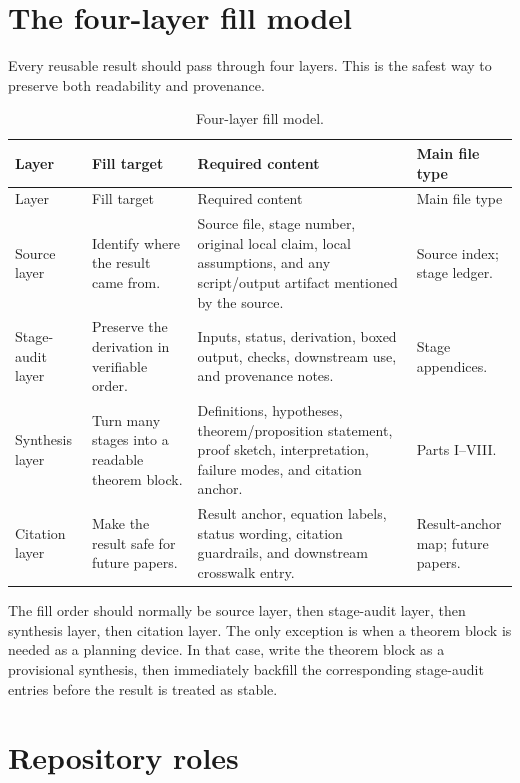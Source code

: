 \section{The four-layer fill model}
\label{sec:fill-four-layer-model}

Every reusable result should pass through four layers.  This is the safest way to preserve both readability and provenance.

\begin{longtable}{@{}L{0.18\textwidth}L{0.29\textwidth}L{0.36\textwidth}L{0.10\textwidth}@{}}
\caption{Four-layer fill model.}\label{tab:four-layer-fill-model}\\
\toprule
Layer & Fill target & Required content & Main file type \\
\midrule
\endfirsthead
\toprule
Layer & Fill target & Required content & Main file type \\
\midrule
\endhead
Source layer & Identify where the result came from. & Source file, stage number, original local claim, local assumptions, and any script/output artifact mentioned by the source. & Source index; stage ledger. \\
\addlinespace
Stage-audit layer & Preserve the derivation in verifiable order. & Inputs, status, derivation, boxed output, checks, downstream use, and provenance notes. & Stage appendices. \\
\addlinespace
Synthesis layer & Turn many stages into a readable theorem block. & Definitions, hypotheses, theorem/proposition statement, proof sketch, interpretation, failure modes, and citation anchor. & Parts I--VIII. \\
\addlinespace
Citation layer & Make the result safe for future papers. & Result anchor, equation labels, status wording, citation guardrails, and downstream crosswalk entry. & Result-anchor map; future papers. \\
\bottomrule
\end{longtable}

The fill order should normally be source layer, then stage-audit layer, then synthesis layer, then citation layer.  The only exception is when a theorem block is needed as a planning device.  In that case, write the theorem block as a provisional synthesis, then immediately backfill the corresponding stage-audit entries before the result is treated as stable.

\section{Repository roles}
\label{sec:fill-repository-roles}

